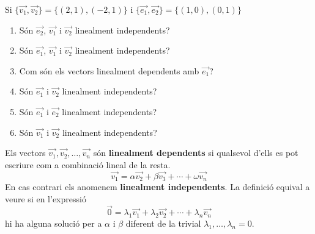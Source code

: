 \Exercise Si $\{\overrightarrow{v_1},\overrightarrow{v_2}\} = \{ (2,1),(-2,1) \}$ i $\{\overrightarrow{e_1},\overrightarrow{e_2}\} = \{ (1,0),(0,1) \}$
\begin{enumerate}
  \item Són $\overrightarrow{e_2}$, $\overrightarrow{v_1}$ i $\overrightarrow{v_2}$ linealment independents?
  \item Són $\overrightarrow{e_1}$, $\overrightarrow{v_1}$ i $\overrightarrow{v_2}$ linealment independents?
  \item Com són els vectors linealment dependents amb $\overrightarrow{e_1}$?
  \item Són $\overrightarrow{e_1}$ i $\overrightarrow{v_2}$ linealment independents?
  \item Són $\overrightarrow{e_1}$ i $\overrightarrow{e_2}$ linealment independents?
  \item Són $\overrightarrow{v_1}$ i $\overrightarrow{v_2}$ linealment independents?
\end{enumerate}

\Answer Els vectors $\overrightarrow{v_1},\overrightarrow{v_2}, \ldots, \overrightarrow{v_n}$ són {\bf linealment dependents} si qualsevol d'ells es pot escriure com a  combinació lineal de la resta.    
\[\vec{v_1} = \alpha \overrightarrow{v_2} + \beta \overrightarrow{v_3} + \cdots + \omega \overrightarrow{v_n}\]
En cas contrari els anomenem {\bf linealment independents}. La definició equival a veure si en l'expressió
\[\vec{0} = \lambda_1 \overrightarrow{v_1} + \lambda_2 \overrightarrow{v_2} + \cdots + \lambda_n \overrightarrow{v_n}\]
hi ha alguna solució per a $\alpha$ i $\beta$ diferent de la trivial $\lambda_1,\ldots,\lambda_n=0$.



